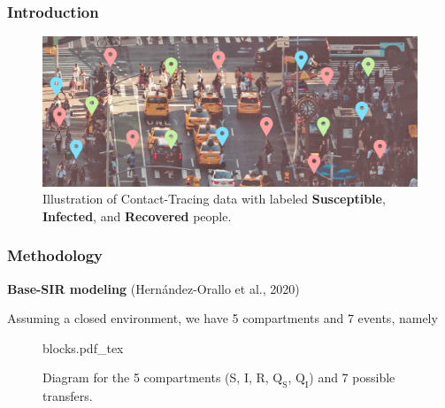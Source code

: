 \documentclass[12pt, aspectratio = 169]{beamer} %
\begin{document}
	\begin{frame}[t]
		\frametitle{Introduction}
		\begin{figure}
			\includegraphics[width = 1\textwidth]{Images/SIR_image}\vspace{-9pt}
			\caption{\justifying Illustration of Contact-Tracing data with labeled\hspace{-1pt} \textcolor{my-blue}{\textbf{Susceptible}}, \textcolor{my-red}{\textbf{Infected}}, and \textcolor{my-green}{\textbf{Recovered}} people.}
			\label{fig:SIR-illustration}
		\end{figure}
	\end{frame}

	\begin{frame}[t]
		\frametitle{Methodology}
		\justifying
		\textcolor{titles}{\textbf{Base-SIR modeling}}  (Hernández-Orallo et al${.}$, 2020)
		
		Assuming a closed environment, we have 5 compartments and 7 events, namely
		\begin{figure}[!ht]
			\centering
			\def\svgwidth{0.85\columnwidth}{blocks.pdf_tex}
			\caption{\justifying Diagram for the 5 compartments (S, I, R, $\text{Q}_{\text{S}}$, $\text{Q}_{\text{I}}$) and 7 possible transfers.}
			\label{fig:base-SIR}
		\end{figure}
	\end{frame}
\end{document}
